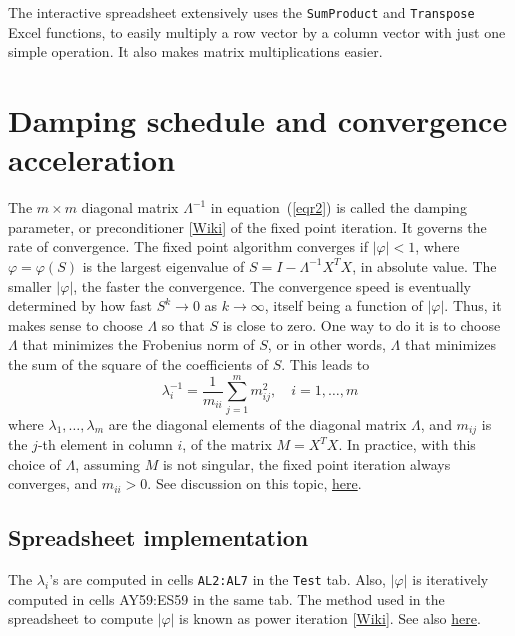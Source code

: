 \documentclass[oneside,10pt]{book}
\begin{document}
The interactive spreadsheet extensively uses the \texttt{SumProduct} and \texttt{Transpose} Excel functions, to easily multiply a row vector by a column vector with just one simple operation. It also makes matrix multiplications easier.

\section{Damping schedule and convergence acceleration}

The $m\times m$ diagonal matrix $\Lambda^{-1}$ in equation~(\ref{eqr2}) is called the damping parameter, or \textcolor{index}{preconditioner} 
[\href{https://en.wikipedia.org/wiki/Preconditioner}{Wiki}] of the fixed point iteration. It governs the rate of convergence.
The fixed point algorithm converges if $|\varphi|<1$, where $\varphi=\varphi(S)$ is the largest eigenvalue of $S=I-\Lambda^{-1} X^T X$, in absolute value. 
The smaller $|\varphi|$, the faster the convergence. The convergence speed is eventually determined by how fast $S^k\rightarrow 0$ as $k\rightarrow\infty$, itself being a function of $|\varphi|$. Thus, it makes sense to choose $\Lambda$ so that $S$ is close to zero. One way to do it is to choose $\Lambda$ that minimizes the Frobenius norm of $S$, or in other words, $\Lambda$ that minimizes the sum of the square of the coefficients of $S$. This leads to 
\begin{equation}
\lambda_i^{-1}=\frac{1}{m_{ii}}\sum_{j=1}^m m_{ij}^2, \quad i=1,\dots,m \label{zizi}
\end{equation}
where $\lambda_1,\dots,\lambda_m$ are the diagonal elements of the diagonal matrix $\Lambda$, and $m_{ij}$ is the $j$-th element in column $i$, of the matrix $M=X^T X$. In practice, with this choice of $\Lambda$, assuming $M$ is not singular, the fixed point iteration always converges, and $m_{ii}>0$. See discussion on this topic, \href{https://mathoverflow.net/questions/421309/power-of-a-matrix-largest-eigenvalue-in-absolute-value-and-convergence-acceler}{here}.

\subsection{Spreadsheet implementation}\label{rbbb2}

The $\lambda_i$'s are computed in cells \texttt{AL2:AL7} in the \texttt{Test} tab. Also, $|\varphi|$ is iteratively computed in cells AY59:ES59 in the same tab. The method used in the spreadsheet to compute $|\varphi|$ is known as \textcolor{index}{power iteration} [\href{https://en.wikipedia.org/wiki/Power_iteration}{Wiki}]. 
See also \href{https://math.stackexchange.com/questions/2554808/finding-approximation-of-largest-eigenvalue}{here}. 
\end{document}
